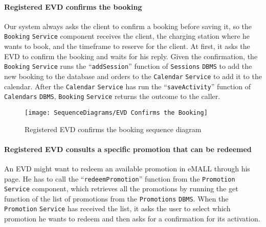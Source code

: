 \paragraph{\texorpdfstring{\protect\hypertarget{evdconfirmsbooking}{Registered EVD confirms the booking}}{}}
Our system always asks the client to confirm a booking before saving it, so the \verb|Booking| \verb|Service| component receives the client, the charging station where he wants to book, and the timeframe to reserve for the client.
At first, it asks the EVD to confirm the booking and waits for his reply.
Given the confirmation, the \verb|Booking| \verb|Service| runs the ``\verb|addSession|'' function of \verb|Sessions| \verb|DBMS| to add the new booking to the database and orders to the \verb|Calendar| \verb|Service| to add it to the calendar.
After the \verb|Calendar| \verb|Service| has run the ``\verb|saveActivity|'' function of \verb|Calendars| \verb|DBMS|, \verb|Booking| \verb|Service| returns the outcome to the caller.
\begin{figure}[H]
    \begin{center}
        \texttt{[image: SequenceDiagrams/EVD Confirms the Booking]}
        \caption{Registered EVD confirms the booking sequence diagram}
        \label{fig:evd_confirms_booking}
    \end{center}
\end{figure}

\paragraph{Registered EVD consults a specific promotion that can be redeemed}
An EVD might want to redeem an available promotion in eMALL through his page.
He has to call the ``\verb|redeemPromotion|'' function from the \verb|Promotion| \verb|Service| component, which retrieves all the promotions by running the get function of the list of promotions from the \verb|Promotions| \verb|DBMS|\@.
When the \verb|Promotion| \verb|Service| has received the list, it asks the user to select which promotion he wants to redeem and then asks for a confirmation for its activation.

